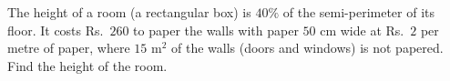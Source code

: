 The height of a room (a rectangular box) is $40\%$ of the semi-perimeter of its floor. It costs Rs.\ $260$ to paper the walls with paper $50$ cm wide at Rs.\ $2$ per metre of paper, where $15\text{ m}^2$ of the walls (doors and windows) is not papered. Find the height of the room.
